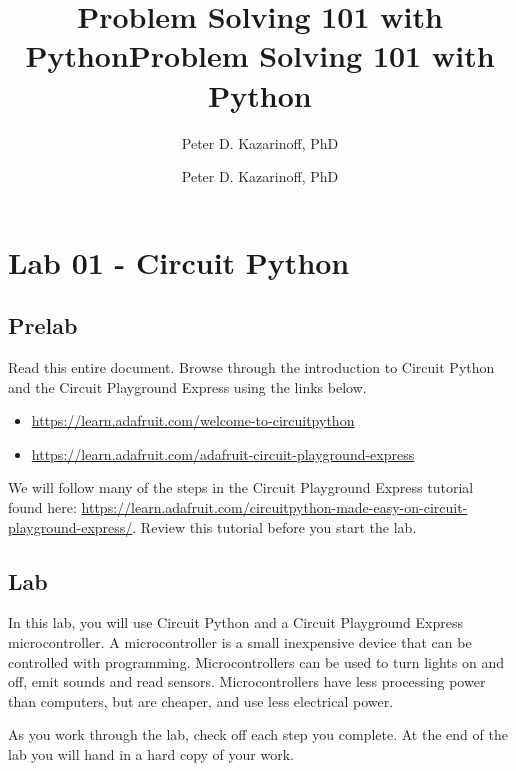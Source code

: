 \documentclass[11pt]{article}
\title{Problem Solving 101 with Python}
\author{Peter D. Kazarinoff, PhD}
\date{}
\title{Problem Solving 101 with Python}
\author{Peter D. Kazarinoff, PhD}
\date{}
\providecommand{\tightlist}{%
      \setlength{\itemsep}{0pt}\setlength{\parskip}{0pt}}
\begin{document}
    
    
    

    
    

    
    \hypertarget{lab-01---circuit-python}{%
\section{Lab 01 - Circuit Python}\label{lab-01---circuit-python}}

    \hypertarget{prelab}{%
\subsection{Prelab}\label{prelab}}

Read this entire document. Browse through the introduction to Circuit
Python and the Circuit Playground Express using the links below.

\begin{itemize}
\tightlist
\item
  \url{https://learn.adafruit.com/welcome-to-circuitpython}
\item
  \url{https://learn.adafruit.com/adafruit-circuit-playground-express}
\end{itemize}

We will follow many of the steps in the Circuit Playground Express
tutorial found here:
\url{https://learn.adafruit.com/circuitpython-made-easy-on-circuit-playground-express/}.
Review this tutorial before you start the lab.

    \hypertarget{lab}{%
\subsection{Lab}\label{lab}}

In this lab, you will use Circuit Python and a Circuit Playground
Express microcontroller. A microcontroller is a small inexpensive device
that can be controlled with programming. Microcontrollers can be used to
turn lights on and off, emit sounds and read sensors. Microcontrollers
have less processing power than computers, but are cheaper, and use less
electrical power.

As you work through the lab, check off each step you complete. At the
end of the lab you will hand in a hard copy of your work.
\end{document}
